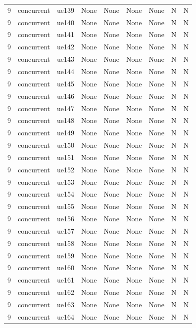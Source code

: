 \begin{table}[ht]
\begin{tabular}{|c|c|c|c|c|c|c|c|c|}
9 & concurrent & ue139 & None & None & None & None & N & N \\
9 & concurrent & ue140 & None & None & None & None & N & N \\
9 & concurrent & ue141 & None & None & None & None & N & N \\
9 & concurrent & ue142 & None & None & None & None & N & N \\
9 & concurrent & ue143 & None & None & None & None & N & N \\
9 & concurrent & ue144 & None & None & None & None & N & N \\
9 & concurrent & ue145 & None & None & None & None & N & N \\
9 & concurrent & ue146 & None & None & None & None & N & N \\
9 & concurrent & ue147 & None & None & None & None & N & N \\
9 & concurrent & ue148 & None & None & None & None & N & N \\
9 & concurrent & ue149 & None & None & None & None & N & N \\
9 & concurrent & ue150 & None & None & None & None & N & N \\
9 & concurrent & ue151 & None & None & None & None & N & N \\
9 & concurrent & ue152 & None & None & None & None & N & N \\
9 & concurrent & ue153 & None & None & None & None & N & N \\
9 & concurrent & ue154 & None & None & None & None & N & N \\
9 & concurrent & ue155 & None & None & None & None & N & N \\
9 & concurrent & ue156 & None & None & None & None & N & N \\
9 & concurrent & ue157 & None & None & None & None & N & N \\
9 & concurrent & ue158 & None & None & None & None & N & N \\
9 & concurrent & ue159 & None & None & None & None & N & N \\
9 & concurrent & ue160 & None & None & None & None & N & N \\
9 & concurrent & ue161 & None & None & None & None & N & N \\
9 & concurrent & ue162 & None & None & None & None & N & N \\
9 & concurrent & ue163 & None & None & None & None & N & N \\
9 & concurrent & ue164 & None & None & None & None & N & N \\

\end{tabular}
\end{table}
